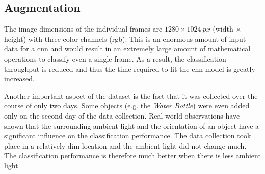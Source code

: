\subsection{Augmentation}
\label{subsec:training_of_the_cnn:dataset:augmentation}


The image dimensions of the individual frames are $1280\times\SI{1024}{px}$ (width $\times$ height) with three color channels (\acrshort{rgb}).
This is an enormous amount of input data for a \acrlong{cnn} and would result in an extremely large amount of mathematical operations to classify even a single frame.
As a result, the classification throughput is reduced and thus the time required to fit the \acrshort{cnn} model is greatly increased.

Another important aspect of the dataset is the fact that it was collected over the course of only two days.
Some objects (e.g. the \textit{Water Bottle}) were even added only on the second day of the data collection. %
Real-world observations have shown that the surrounding ambient light and the orientation of an object have a significant influence on the classification performance.
The data collection took place in a relatively dim location and the ambient light did not change much.
The classification performance is therefore much better when there is less ambient light.

